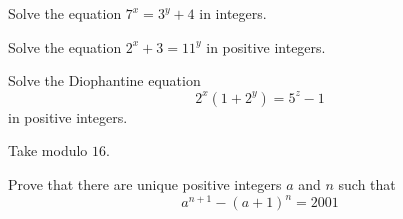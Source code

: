 \begin{problem} %
	Solve the equation $7^x=3^y+4$ in integers.
\end{problem}

\begin{problem} %
 Solve the equation $2^x+3=11^y$ in positive integers.
\end{problem}

\begin{problem} %
	Solve the Diophantine equation $$2^x(1+2^y)=5^z-1$$ in positive integers.
\end{problem}

\begin{hint}
	Take modulo $16$.
\end{hint}

\begin{problem}[Putnam 2001] %
	Prove that there are unique positive integers $a$ and $n$ such that $$a^{n+1}-(a+1)^n=2001$$
\end{problem}